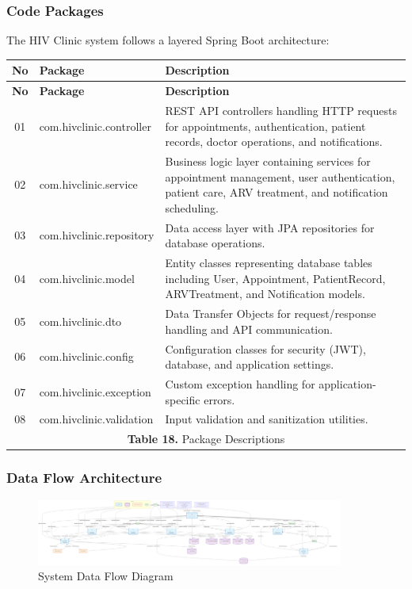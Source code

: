 \documentclass[12pt,a4paper]{article}
\begin{document}
\subsubsection{Code Packages}

The HIV Clinic system follows a layered Spring Boot architecture:
\renewcommand{\arraystretch}{1.4}
\begin{longtable}{|c|p{6cm}|p{8cm}|}
\hline
\textbf{No} & \textbf{Package} & \textbf{Description} \\
\hline
\endfirsthead

\hline
\textbf{No} & \textbf{Package} & \textbf{Description} \\
\hline
\endhead

01 & com.hivclinic.controller & REST API controllers handling HTTP requests for appointments, authentication, patient records, doctor operations, and notifications. \\
\hline
02 & com.hivclinic.service & Business logic layer containing services for appointment management, user authentication, patient care, ARV treatment, and notification scheduling. \\
\hline
03 & com.hivclinic.repository & Data access layer with JPA repositories for database operations. \\
\hline
04 & com.hivclinic.model & Entity classes representing database tables including User, Appointment, PatientRecord, ARVTreatment, and Notification models. \\
\hline
05 & com.hivclinic.dto & Data Transfer Objects for request/response handling and API communication. \\
\hline
06 & com.hivclinic.config & Configuration classes for security (JWT), database, and application settings. \\
\hline
07 & com.hivclinic.exception & Custom exception handling for application-specific errors. \\
\hline
08 & com.hivclinic.validation & Input validation and sanitization utilities. \\
\hline
\multicolumn{3}{|c|}{\textbf{Table 18.} Package Descriptions} \\
\hline
\end{longtable}

\subsubsection{Data Flow Architecture}

\begin{figure}[H]
\centering
\includegraphics[width=0.9\textwidth]{diagrams/data_flow_diagram.png}
\caption{System Data Flow Diagram}
\label{fig:data-flow-diagram}
\end{figure}
\end{document}
